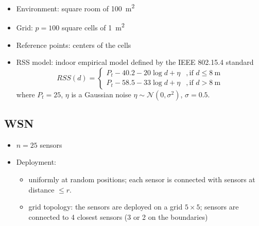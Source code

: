 \documentclass{article}
\begin{document}
\begin{itemize}
    \item Environment: square room of \SI{100}{\metre\squared}
    \item Grid: $p = 100$ square cells of \SI{1}{\metre\squared}
    \item Reference points: centers of the cells
    \item RSS model: indoor empirical model defined by the IEEE 802.15.4 standard
        \begin{equation}
            RSS(d) = \begin{cases}
                P_t - 40.2 - 20\log{d} + \eta & , \text{if $d\leq \SI{8}{\metre}$}\\
                P_t - 58.5 - 33\log{d} + \eta & , \text{if $d > \SI{8}{\metre}$}
            \end{cases}
        \end{equation}
        where $P_t=25$, $\eta$ is a Gaussian noise $\eta \sim \mathcal{N}(0,\sigma^2)$, $\sigma = 0.5$.
\end{itemize}

\subsection{WSN}

\begin{itemize}
    \item $n = 25$ sensors
    \item Deployment:
    \begin{itemize}
        \item uniformly at random positions; each sensor is connected with sensors at distance $\le r$.
        \item grid topology: the sensors are deployed on a grid $5 \times 5$; sensors are connected to 
        4 closest sensors (3 or 2 on the boundaries)
    \end{itemize}
\end{itemize}

\end{document}
